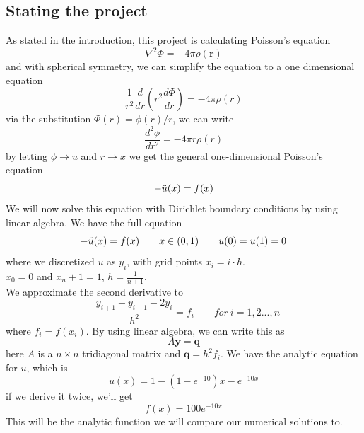 \documentclass{article}
\begin{document}
\subsection{Stating the project}
As stated in the introduction, this project is calculating Poisson's equation
$$\nabla^{2}\Phi = -4\pi\rho(\mathbf{r})$$
and with spherical symmetry, we can simplify the equation to a one dimensional equation
$$\frac{1}{r^2}\frac{d}{dr}(r^2\frac{d\Phi}{dr}) = -4\pi\rho(r)$$
via the substitution $\Phi (r) = \phi(r)/r$, we can write
$$\frac{d^2 \phi}{dr^2} = -4\pi r\rho(r)$$
by letting $\phi \rightarrow u$ and $r \rightarrow x$ we get the general one-dimensional Poisson's equation
$$-\Ddot{u}(x) = f(x)$$
We will now solve this equation with Dirichlet boundary conditions by using linear algebra.
We have the full equation
$$-\Ddot{u}(x) = f(x) \qquad x \in (0,1) \qquad u(0) = u(1) = 0$$
where we discretized $u$ as $y_i$, with grid points $x_i = i\cdot h$. \\
$x_0 = 0$ and $x_n+1 = 1$, $ h = \frac{1}{n + 1}$. \\
We approximate the second derivative to
$$-\frac{y_{i+1} + y_{i-1} - 2y_i}{h^2} = f_i \qquad for\ i = 1, 2...,n$$
where $f_i = f(x_i)$. By using linear algebra, we can write this as
$$A\mathbf{y} = \mathbf{q}$$
here $A$ is a $n \times n$ tridiagonal matrix and $\mathbf{q} = h^2f_i$.
We have the analytic equation for $u$, which is
$$u(x) = 1 - (1 - e^{-10})x - e^{-10x}$$
if we derive it twice, we'll get
$$f(x) = 100e^{-10x}$$
This will be the analytic function we will compare our numerical solutions to.
\end{document}
